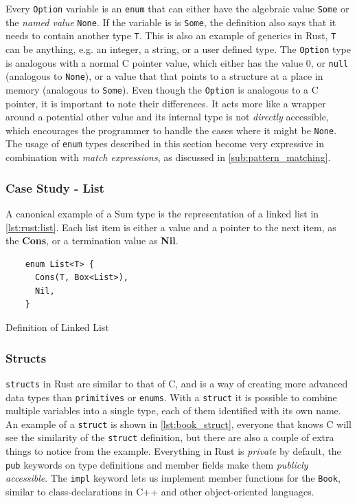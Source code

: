 Every \texttt{Option} variable is an \texttt{enum} that can either have the algebraic value \texttt{Some} or the \emph{named value} \texttt{None}.
If the variable is is \texttt{Some}, the definition also says that it needs to contain another type \texttt{T}.
This is also an example of generics in Rust, \texttt{T} can be anything, e.g. an integer, a string, or a user defined type.
The \texttt{Option} type is analogous with a normal C pointer value, which either has the value 0, or \texttt{null} (analogous to \texttt{None}), or a value that that points to a structure at a place in memory (analogous to \texttt{Some}).
Even though the \texttt{Option} is analogous to a C pointer, it is important to note their differences.
It acts more like a wrapper around a potential other value and its internal type is not \emph{directly} accessible, which encourages the programmer to handle the cases where it might be \texttt{None}.
The usage of \texttt{enum} types described in this section become very expressive in combination with \emph{match expressions}, as discussed in \autoref{sub:pattern_matching}.

\subsubsection{Case Study - List}

A canonical example of a Sum type is the representation of a linked list in \autoref{lst:rust:list}.
Each list item is either a value and a pointer to the next item, as the \textbf{Cons}, or a termination value as \textbf{Nil}.

\begin{listing}[H]
  \begin{verbatim}
    enum List<T> {
      Cons(T, Box<List>),
      Nil,
    }
  \end{verbatim}
  \caption{Definition of Linked List}
  \label{lst:rust:list}
\end{listing}

\subsubsection{Structs}
\label{ssub:structs}

\texttt{structs} in Rust are similar to that of C, and is a way of creating more advanced data types than \texttt{primitives} or \texttt{enums}.
With a \texttt{struct} it is possible to combine multiple variables into a single type, each of them identified with its own name.
An example of a \texttt{struct} is shown in \autoref{lst:book_struct}, everyone that knows C will see the similarity of the \texttt{struct} definition, but there are also a couple of extra things to notice from the example.
Everything in Rust is \emph{private} by default, the \texttt{pub} keywords on type definitions and member fields make them \emph{publicly accessible}.
The \texttt{impl} keyword lets us implement member functions for the \texttt{Book}, similar to class-declarations in C++ and other object-oriented languages.

